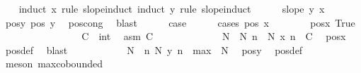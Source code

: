 \begin{isabellebody}
\ \ \isamarkupfalse%
\ {\isacharparenleft}{\kern0pt}induct\ x\ rule{\isacharcolon}{\kern0pt}\ slope{\isacharunderscore}{\kern0pt}induct{\isacharcomma}{\kern0pt}\ induct\ y\ rule{\isacharcolon}{\kern0pt}\ slope{\isacharunderscore}{\kern0pt}induct{\isacharparenright}{\kern0pt}\isanewline
\ \ \ \ \isamarkupfalse%
\ {\isacharparenleft}{\kern0pt}slope\ y\ x{\isacharparenright}{\kern0pt}\isanewline
\ \ \ \ \isamarkupfalse%
\ pos{\isacharunderscore}{\kern0pt}y{\isacharcolon}{\kern0pt}\ {\isachardoublequoteopen}pos\ y{\isachardoublequoteclose}\ \isamarkupfalse%
\ pos{\isacharunderscore}{\kern0pt}cong\ \isamarkupfalse%
\ blast\isanewline
\ \ \ \ \isamarkupfalse%
\ {\isacharquery}{\kern0pt}case\isanewline
\ \ \ \ \isamarkupfalse%
\ {\isacharparenleft}{\kern0pt}cases\ {\isachardoublequoteopen}pos\ x{\isachardoublequoteclose}{\isacharparenright}{\kern0pt}\isanewline
\ \ \ \ \ \ \isamarkupfalse%
\ pos{\isacharunderscore}{\kern0pt}x{\isacharcolon}{\kern0pt}\ True\isanewline
\ \ \ \ \ \ \isacommand{{\isacharbraceleft}{\kern0pt}}\isamarkupfalse%
\isanewline
\ \ \ \ \ \ \ \ \isamarkupfalse%
\ C\ {\isacharcolon}{\kern0pt}{\isacharcolon}{\kern0pt}\ int\ \isamarkupfalse%
\ asm{\isacharcolon}{\kern0pt}\ {\isachardoublequoteopen}C\ {\isasymge}\ {}{\isachardoublequoteclose}\isanewline
\ \ \ \ \ \ \ \ \isamarkupfalse%
\ \isamarkupfalse%
\ N\ \ N{\isacharcolon}{\kern0pt}\ {\isachardoublequoteopen}{\isasymforall}n\ {\isasymge}\ N{\isachardot}{\kern0pt}\ x\ n\ {\isasymge}\ C{\isachardoublequoteclose}\ \isamarkupfalse%
\ pos{\isacharunderscore}{\kern0pt}x\ \isamarkupfalse%
\ pos{\isacharunderscore}{\kern0pt}def\ \isamarkupfalse%
\ blast\isanewline
\ \ \ \ \ \ \ \ \isamarkupfalse%
\ \isamarkupfalse%
\ N{\isacharprime}{\kern0pt}\ \ {\isachardoublequoteopen}{\isasymforall}n{\isasymge}\ N{\isacharprime}{\kern0pt}{\isachardot}{\kern0pt}\ y\ n\ {\isasymge}\ max\ {}\ N{\isachardoublequoteclose}\ \isamarkupfalse%
\ pos{\isacharunderscore}{\kern0pt}y\ \isamarkupfalse%
\ pos{\isacharunderscore}{\kern0pt}def\ \isamarkupfalse%
\ {\isacharparenleft}{\kern0pt}meson\ max{\isachardot}{\kern0pt}cobounded{}{\isacharparenright}{\kern0pt}\isanewline
\ \ \ \ \ \ \ \ \isamarkupfalse%

\end{isabellebody}
